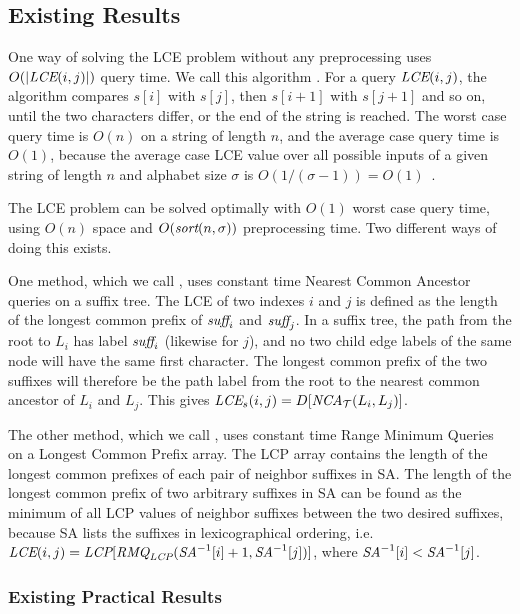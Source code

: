 \documentclass[a4]{article}
\newcommand*{\pref}{\prettyref}
\begin{document}
\subsection{Existing Results\label{sec:existing-results}}

One way of solving the LCE problem without any preprocessing uses $O(|\textit{LCE}(i,j)|)$ query time. We call this algorithm . For a query $\textit{LCE}(i,j)$, the algorithm compares $s[i]$ with $s[j]$, then $s[i+1]$ with $s[j+1]$ and so on, until the two characters differ, or the end of the string is reached. The worst case query time is $O(n)$ on a string of length $n$, and the average case query time is $O(1)$, because the average case LCE value over all possible inputs of a given string of length $n$ and alphabet size $\sigma$ is $O(1/(\sigma-1))=O(1)$~\cite{ilie-navarro-tinta}.

The LCE problem can be solved optimally with $O(1)$ worst case query time, using $O(n)$ space and $O(\textit{sort}(n,\sigma))$ preprocessing time. Two different ways of doing this exists.

One method, which we call , uses constant time Nearest Common Ancestor queries on a suffix tree. The LCE of two indexes $i$ and $j$ is defined as the length of the longest common prefix of $\textit{suff}_i$ and $\textit{suff}_j$. In a suffix tree, the path from the root to $L_i$ has label $\textit{suff}_i$ (likewise for $j$), and no two child edge labels of the same node will have the same first character. The longest common prefix of the two suffixes will therefore be the path label from the root to the nearest common ancestor of $L_i$ and $L_j$. This gives $\textit{LCE}_s(i,j) = D[\textit{NCA}_\mathcal{T}(L_i,L_j)]$.

The other method, which we call , uses constant time Range Minimum Queries on a Longest Common Prefix array. The LCP array contains the length of the longest common prefixes of each pair of neighbor suffixes in SA. The length of the longest common prefix of two arbitrary suffixes in SA can be found as the minimum of all LCP values of neighbor suffixes between the two desired suffixes, because SA lists the suffixes in lexicographical ordering, i.e. $\textit{LCE}(i,j)=\textit{LCP}[\textit{RMQ}_{\textit{LCP}}(\textit{SA}^{-1}[i] + 1, \textit{SA}^{-1}[j])]$, where $\textit{SA}^{-1}[i] < \textit{SA}^{-1}[j]$. %

\subsubsection{Existing Practical Results}
\end{document}
